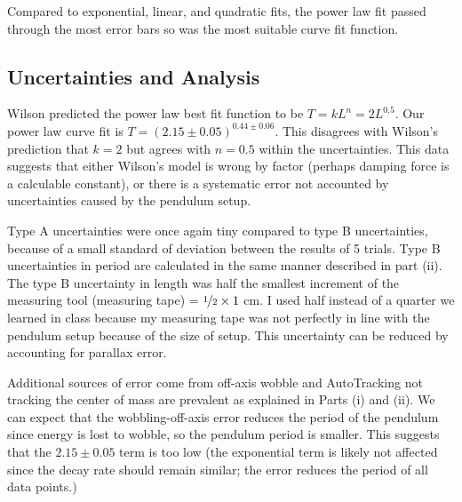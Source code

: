 \documentclass[notitlepage, twocolumn, 12pt]{article}
\begin{document}
    Compared to exponential, linear, and quadratic fits, the power law fit passed through the most error bars so was the most suitable curve fit function.

    \subsection*{Uncertainties and Analysis}
    Wilson predicted the power law best fit function to be $T = kL^n = 2L^{0.5}$. Our power law curve fit is $T = (2.15 \pm 0.05)^{0.44\pm 0.06}$. This disagrees with Wilson's prediction that $k = 2$ but agrees with $n=0.5$ within the uncertainties.  This data suggests that either Wilson's model is wrong by factor (perhaps damping force is a calculable constant), or there is a systematic error not accounted by uncertainties caused by the pendulum setup. 

    Type A uncertainties were once again tiny compared to type B uncertainties, because of a small standard of deviation between the results of 5 trials. Type B uncertainties in period are calculated in the same manner described in part (ii). The type B uncertainty in length was half the smallest increment of the measuring tool (measuring tape) = $\nicefrac{1}{2}\times 1$ cm. I used half instead of a quarter we learned in class because my measuring tape was not perfectly in line with the pendulum setup because of the size of setup. This uncertainty can be reduced by accounting for parallax error.

    Additional sources of error come from off-axis wobble and AutoTracking not tracking the center of mass are prevalent as explained in Parts (i) and (ii). We can expect that the wobbling-off-axis error reduces the period of the pendulum since energy is lost to wobble, so the pendulum period is smaller. This suggests that the $2.15 \pm 0.05$ term is too low (the exponential term is likely not affected since the decay rate should remain similar; the error reduces the period of all data points.)
\end{document}
